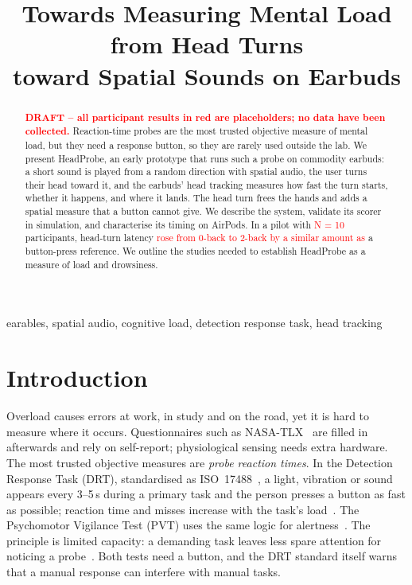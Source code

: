 \documentclass[conference,letterpaper]{IEEEtran}
\newcommand{\ph}[1]{\textcolor{red}{#1}}
\newcommand{\todo}[1]{\textcolor{red}{[TODO: #1]}}
\newcommand{\draftbanner}{\textcolor{red}{\textbf{DRAFT -- all participant results in red are placeholders; no data have been collected.}}}
\begin{document}
\title{Towards Measuring Mental Load from Head Turns\\ toward Spatial Sounds on Earbuds}

\author{\IEEEauthorblockN{\todo{Author names}}
\IEEEauthorblockA{\todo{Department, institution, city, country}\\
\todo{email addresses}}}

\maketitle

\begin{abstract}
\draftbanner{}
Reaction-time probes are the most trusted objective measure of mental load, but they need a response
button, so they are rarely used outside the lab. We present HeadProbe, an early prototype that runs
such a probe on commodity earbuds: a short sound is played from a random direction with spatial
audio, the user turns their head toward it, and the earbuds' head tracking measures how fast the turn
starts, whether it happens, and where it lands. The head turn frees the hands and adds a spatial
measure that a button cannot give. We describe the system, validate its scorer in simulation, and
characterise its timing on AirPods. In a pilot with \ph{N = 10} participants, head-turn latency
\ph{rose from 0-back to 2-back by a similar amount as} a button-press reference. We outline the
studies needed to establish HeadProbe as a measure of load and drowsiness.
\end{abstract}

\begin{IEEEkeywords}
earables, spatial audio, cognitive load, detection response task, head tracking
\end{IEEEkeywords}

\section{Introduction}
Overload causes errors at work, in study and on the road, yet it is hard to measure where it occurs.
Questionnaires such as NASA-TLX~\cite{hart2006nasa} are filled in afterwards and rely on self-report;
physiological sensing needs extra hardware. The most trusted objective measures are \emph{probe
reaction times}. In the Detection Response Task (DRT), standardised as ISO~17488~\cite{iso17488}, a
light, vibration or sound appears every 3--5\,s during a primary task and the person presses a button
as fast as possible; reaction time and misses increase with the task's load~\cite{strayer2015assessing}.
The Psychomotor Vigilance Test (PVT) uses the same logic for alertness~\cite{basner2011maximizing}.
The principle is limited capacity: a demanding task leaves less spare attention for noticing a
probe~\cite{kahneman1973attention}. Both tests need a button, and the DRT standard itself warns that
a manual response can interfere with manual tasks.
\end{document}
